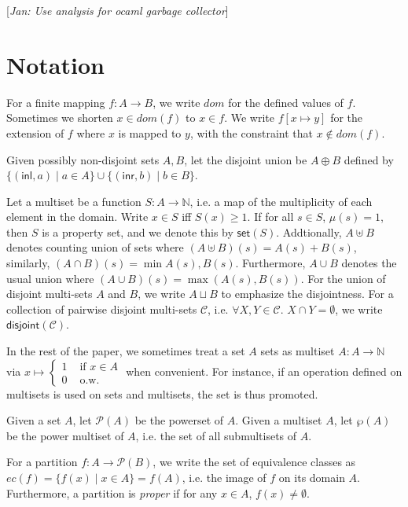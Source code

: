 \documentclass{easychair}
\newcommand{\ms}[1]{\ensuremath{\mathsf{#1}}}
\newcommand{\dist}[1]{\mathsf{disjoint}(#1)}
\newcommand{\jan}[1]{{\color{red} [\emph{Jan: #1}]}}
\theoremstyle{definition}
\begin{document}
\jan{Use analysis for ocaml garbage collector}
\newpage
\label{sect:bib}

%
%
%


\appendix

\section{Notation}
\label{sect:notation}
For a finite mapping $f : A \to B$, we write $dom$ for the defined values of $f$. Sometimes we shorten $x \in dom(f)$ to $x \in f$. We write $f[x \mapsto y]$ for the extension of $f$ where $x$ is mapped to $y$, with the constraint that $x \notin dom(f)$. 

Given possibly non-disjoint sets $A,B$, let the disjoint union be $A \oplus B$ defined by 
$\{(\ms{inl},a) \mid a \in A\} \cup \{(\ms{inr},b) \mid b \in B\}$.

Let a multiset be a function $S : A \to \mathbb{N}$, i.e. a map of the multiplicity of each element in the domain.  Write $x \in S$ iff $S(x) \ge 1$. If for all  $s \in S$, $\mu(s) = 1$, then $S$ 
is a property set, and we denote this by $\ms{set}(S)$. Addtionally, $A \uplus B$ denotes 
counting union of sets where $(A \uplus B) (s) = A (s) + B(s)$, similarly, 
$(A \cap B)(s) = \min{A(s),B(s)}$. Furthermore, $A \cup B$ denotes the usual union where 
$(A \cup B)(s) = \max{(A(s),B(s))}$.  For the union of disjoint multi-sets $A$ and $B$, 
we write $A \sqcup B$ to emphasize the disjointness.  For a collection of pairwise disjoint 
multi-sets $\mathcal{C}$, i.e. $\forall X,Y \in \mathcal{C}$. $X \cap Y = \emptyset$, we write $\dist{\mathcal{C}}$.

In the rest of the paper, 
we sometimes treat a set $A$ sets as multiset $A : A \to \mathbb{N}$ via 
$x \mapsto \begin{cases} 1 &\text{ if } x \in A \\0 &\text{ o.w.}\end{cases}$ when convenient. 
For instance, if an operation defined on multisets is used on sets and multisets, the set 
is thus promoted.

Given a set $A$, let $\mathcal{P}(A)$ be the powerset of $A$. Given a multiset $A$, let 
$\wp(A)$ be the power multiset of $A$, i.e. the set of all submultisets of $A$.

For a partition $f : A \to \mathcal{P}(B)$, we write the set of equivalence classes
as $ec(f) = \{f(x) \mid x \in A\} = f(A)$, i.e. the image of $f$ on its domain $A$.
Furthermore, a partition is \emph{proper} if for any $x \in A$, $f(x) \neq \emptyset$.
\end{document}
